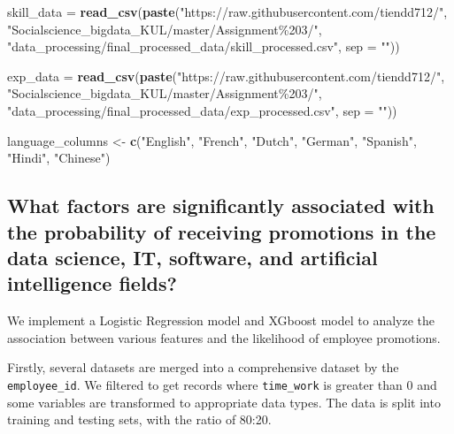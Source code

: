 \documentclass[11pt,]{article}
\newenvironment{Shaded}{\begin{snugshade}}{\end{snugshade}}
\newcommand{\AttributeTok}[1]{\textcolor[rgb]{0.13,0.29,0.53}{#1}}
\newcommand{\FunctionTok}[1]{\textcolor[rgb]{0.13,0.29,0.53}{\textbf{#1}}}
\newcommand{\NormalTok}[1]{#1}
\newcommand{\OtherTok}[1]{\textcolor[rgb]{0.56,0.35,0.01}{#1}}
\newcommand{\StringTok}[1]{\textcolor[rgb]{0.31,0.60,0.02}{#1}}
\begin{document}
\begin{Shaded}
\begin{Highlighting}[]
\NormalTok{skill\_data }\OtherTok{=} \FunctionTok{read\_csv}\NormalTok{(}\FunctionTok{paste}\NormalTok{(}\StringTok{"https://raw.githubusercontent.com/tiendd712/"}\NormalTok{,}
                        \StringTok{"Socialscience\_bigdata\_KUL/master/Assignment\%203/"}\NormalTok{,}
                        \StringTok{"data\_processing/final\_processed\_data/skill\_processed.csv"}\NormalTok{,}
                        \AttributeTok{sep =} \StringTok{""}\NormalTok{)) }

\NormalTok{exp\_data }\OtherTok{=} \FunctionTok{read\_csv}\NormalTok{(}\FunctionTok{paste}\NormalTok{(}\StringTok{"https://raw.githubusercontent.com/tiendd712/"}\NormalTok{,}
                        \StringTok{"Socialscience\_bigdata\_KUL/master/Assignment\%203/"}\NormalTok{,}
                        \StringTok{"data\_processing/final\_processed\_data/exp\_processed.csv"}\NormalTok{,}
                        \AttributeTok{sep =} \StringTok{""}\NormalTok{)) }

\NormalTok{language\_columns }\OtherTok{\textless{}{-}} \FunctionTok{c}\NormalTok{(}\StringTok{"English"}\NormalTok{, }\StringTok{"French"}\NormalTok{, }\StringTok{"Dutch"}\NormalTok{, }\StringTok{"German"}\NormalTok{, }
                      \StringTok{"Spanish"}\NormalTok{, }\StringTok{"Hindi"}\NormalTok{, }\StringTok{"Chinese"}\NormalTok{)}
\end{Highlighting}
\end{Shaded}

\hypertarget{what-factors-are-significantly-associated-with-the-probability-of-receiving-promotions-in-the-data-science-it-software-and-artificial-intelligence-fields}{%
\subsection{What factors are significantly associated with the
probability of receiving promotions in the data science, IT, software,
and artificial intelligence
fields?}\label{what-factors-are-significantly-associated-with-the-probability-of-receiving-promotions-in-the-data-science-it-software-and-artificial-intelligence-fields}}

We implement a Logistic Regression model and XGboost model to analyze
the association between various features and the likelihood of employee
promotions.

Firstly, several datasets are merged into a comprehensive dataset by the
\texttt{employee\_id}. We filtered to get records where
\texttt{time\_work} is greater than 0 and some variables are transformed
to appropriate data types. The data is split into training and testing
sets, with the ratio of 80:20.
\end{document}
